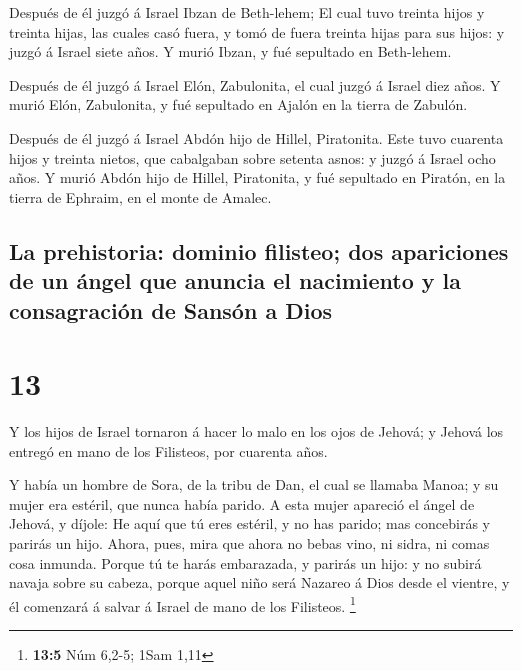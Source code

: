  Después de él juzgó á Israel Ibzan de Beth-lehem;
 El cual tuvo treinta hijos y treinta hijas, las cuales
casó fuera, y tomó de fuera treinta hijas para sus hijos: y juzgó á
Israel siete años.  Y murió Ibzan, y fué sepultado en
Beth-lehem.

 Después de él juzgó á Israel Elón, Zabulonita, el cual
juzgó á Israel diez años.  Y murió Elón, Zabulonita, y
fué sepultado en Ajalón en la tierra de Zabulón.

 Después de él juzgó á Israel Abdón hijo de Hillel,
Piratonita.  Este tuvo cuarenta hijos y treinta nietos,
que cabalgaban sobre setenta asnos: y juzgó á Israel ocho años.
 Y murió Abdón hijo de Hillel, Piratonita, y fué
sepultado en Piratón, en la tierra de Ephraim, en el monte de Amalec.

\hypertarget{la-prehistoria-dominio-filisteo-dos-apariciones-de-un-uxe1ngel-que-anuncia-el-nacimiento-y-la-consagraciuxf3n-de-sansuxf3n-a-dios}{%
\subsection{La prehistoria: dominio filisteo; dos apariciones de un
ángel que anuncia el nacimiento y la consagración de Sansón a
Dios}\label{la-prehistoria-dominio-filisteo-dos-apariciones-de-un-uxe1ngel-que-anuncia-el-nacimiento-y-la-consagraciuxf3n-de-sansuxf3n-a-dios}}

\hypertarget{section-12}{%
\section{13}\label{section-12}}

 Y los hijos de Israel tornaron á hacer lo malo en los
ojos de Jehová; y Jehová los entregó en mano de los Filisteos, por
cuarenta años.

 Y había un hombre de Sora, de la tribu de Dan, el cual se
llamaba Manoa; y su mujer era estéril, que nunca había parido.
 A esta mujer apareció el ángel de Jehová, y díjole: He
aquí que tú eres estéril, y no has parido; mas concebirás y parirás un
hijo.  Ahora, pues, mira que ahora no bebas vino, ni
sidra, ni comas cosa inmunda.  Porque tú te harás
embarazada, y parirás un hijo: y no subirá navaja sobre su cabeza,
porque aquel niño será Nazareo á Dios desde el vientre, y él comenzará á
salvar á Israel de mano de los Filisteos. \footnote{\textbf{13:5} Núm
  6,2-5; 1Sam 1,11}

